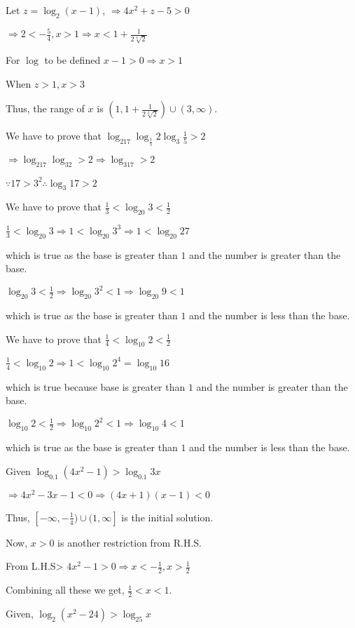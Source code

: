   Let $z = \log_2(x - 1)$, $\Rightarrow 4x^2 + z - 5 > 0$

  $\Rightarrow 2 < -\frac{5}{4}, x > 1 \Rightarrow x < 1 + \frac{1}{2\sqrt[4]{2}}$

  For $\log$ to be defined $x -1 > 0 \Rightarrow x > 1$

  When $z > 1, x > 3$

  Thus, the range of $x$ is $\left(1, 1 + \frac{1}{2\sqrt[4]{2}}\right)\cup (3, \infty)$.
\item We have to prove that $\log_217\log_{\tfrac{1}{5}}2\log_3\tfrac{1}{5} > 2$

  $\Rightarrow \log_217\log_32 > 2 \Rightarrow \log_317 > 2$

  $\because 17 > 3^2 \therefore \log_3{17} > 2$
\item We have to prove that $\frac{1}{3} < \log_{20}3 < \frac{1}{2}$

  $\frac{1}{3} < \log_{20}3 \Rightarrow 1 < \log_{20}3^3 \Rightarrow 1 < \log_{20}27$

  which is true as the base is greater than $1$ and the number is greater than the base.

  $\log_{20}3 < \frac{1}{2} \Rightarrow \log_{20}3^2 < 1 \Rightarrow \log_{20}9 < 1$

  which is true as the base is greater than $1$ and the number is less than the base.
\item We have to prove that $\frac{1}{4} < \log_{10}2 < \frac{1}{2}$

  $\frac{1}{4} < \log_{10}2 \Rightarrow 1 < \log_{10}2^4 = \log_{10}16$

  which is true because base is greater than $1$ and the number is greater than the base.

  $\log_{10}2 < \frac{1}{2} \Rightarrow \log_{10}2^2 < 1 \Rightarrow \log_{10}4 < 1$

  which is true as the base is greater than $1$ and the number is less than the base.
\item Given $\log_{0.1}(4x^2 - 1) > \log_{0.1}3x$

  $\Rightarrow 4x^2 - 3x - 1 < 0 \Rightarrow (4x + 1)(x - 1) < 0$

  Thus, $[-\infty, -\frac{1}{4})\cup(1, \infty]$ is the initial solution.

  Now, $x > 0$ is another restriction from R.H.S.

  From L.H.S> $4x^2 - 1 > 0 \Rightarrow x < -\frac{1}{2}, x > \frac{1}{2}$

  Combining all these we get, $\frac{1}{2} < x < 1$.
\item Given, $\log_2(x^2 - 24) > \log_25x$

